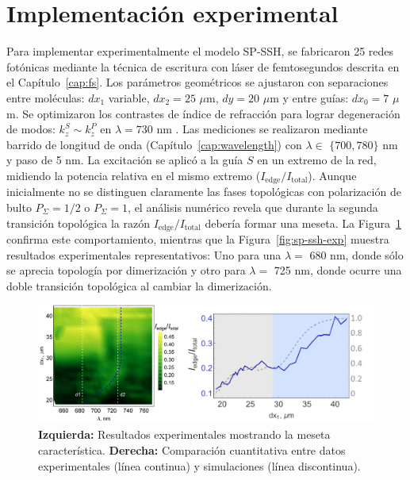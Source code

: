 \section{Implementación experimental}
Para implementar experimentalmente el modelo SP-SSH, se fabricaron 25 redes fotónicas mediante la técnica de escritura con láser de femtosegundos descrita en el Capítulo~\ref{cap:fs}. Los parámetros geométricos se ajustaron con separaciones entre moléculas: $dx_1$ variable, $dx_2 = 25$ $\mu$m, $dy = 20$ $\mu$m y entre guías: $dx_0 = 7$ $\mu$m. Se optimizaron los contrastes de índice de refracción para lograr degeneración de modos: $k_z^S \sim k_z^P$ en $\lambda = 730$ nm \cite{interorbital}. Las mediciones se realizaron mediante barrido de longitud de onda (Capítulo~\ref{cap:wavelength}) con $\lambda \in$ $\{700, 780\}$ nm y paso de 5 nm. La excitación se aplicó a la guía $S$ en un extremo de la red, midiendo la potencia relativa en el mismo extremo ($I_{\text{edge}}/I_{\text{total}}$). Aunque inicialmente no se distinguen claramente las fases topológicas con polarización de bulto $P_\Sigma=1/2$ o $P_\Sigma=1$, el análisis numérico revela que durante la segunda transición topológica la razón $I_{\text{edge}}/I_{\text{total}}$ debería formar una meseta. La Figura~\ref{fig:sp-ssh-num} confirma este comportamiento, mientras que la Figura~\ref{fig:sp-ssh-exp} muestra resultados experimentales representativos: Uno para una $\lambda =$ 680 nm, donde sólo se aprecia topología por dimerización y otro para $\lambda =$ 725 nm, donde ocurre una doble transición topológica al cambiar la dimerización.

\begin{figure}[H]
	\centering
	\includegraphics[width=0.8\linewidth]{media/sp-ssh-exp-num.png}
	\caption[Análisis numérico-experimental del modelo SP-SSH]{
		\textbf{Izquierda:} Resultados experimentales mostrando la meseta característica. 
		\textbf{Derecha:} Comparación cuantitativa entre datos experimentales (línea continua) y simulaciones (línea discontinua).
		\label{fig:sp-ssh-num}}
\end{figure}

